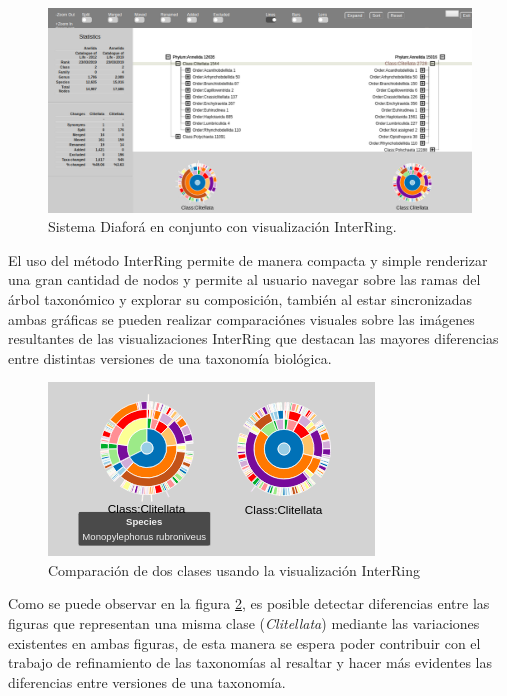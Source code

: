 \documentclass[journal]{IEEEtran}
\begin{document}
\begin{figure}[]
  \centering
  \includegraphics[scale=0.20]{extend_diafora.png}
  \caption{Sistema Diaforá en conjunto con visualización InterRing.}
  \label{}
\end{figure}

El uso del método InterRing permite de manera compacta y simple renderizar una gran cantidad de nodos y permite al usuario navegar sobre las ramas 
del árbol taxonómico y explorar su composición, también al estar sincronizadas ambas gráficas se pueden realizar comparaciónes 
visuales sobre las imágenes resultantes de las visualizaciones InterRing que destacan las mayores diferencias entre distintas versiones de una taxonomía biológica.

\begin{figure}
  \centering
  \includegraphics[]{interringCompare.png}
  \caption{Comparación de dos clases usando la visualización InterRing}
  \label{class_compare}
\end{figure}

Como se puede observar en la figura \ref{class_compare}, es posible detectar diferencias entre las figuras que representan una misma clase (\emph{Clitellata})
mediante las variaciones existentes en ambas figuras, de esta manera se espera poder contribuir con el trabajo de refinamiento de las taxonomías al 
resaltar y hacer más evidentes las diferencias entre versiones de una taxonomía.
\end{document}
